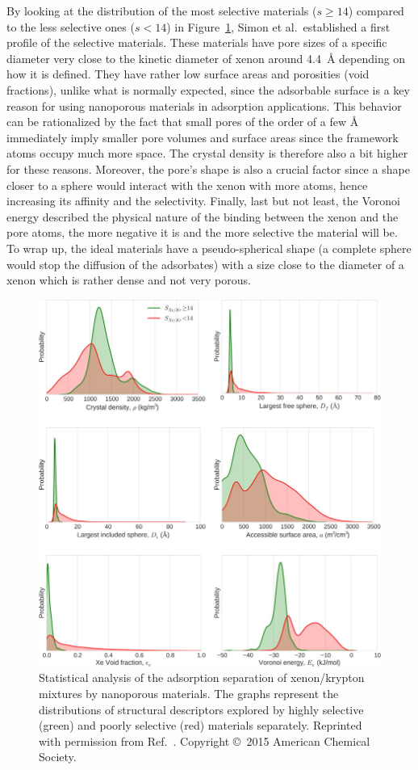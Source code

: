 \documentclass[main.tex]{subfiles}
\begin{document}
By looking at the distribution of the most selective materials ($s\geq 14$) compared to the less selective ones ($s<14$) in Figure~\ref{fgr:Simon2015}, Simon et al.\ established a first profile of the selective materials. These materials have pore sizes of a specific diameter very close to the kinetic diameter of xenon around \SI{4.4}{\angstrom} depending on how it is defined. They have rather low surface areas and porosities (void fractions), unlike what is normally expected, since the adsorbable surface is a key reason for using nanoporous materials in adsorption applications. This behavior can be rationalized by the fact that small pores of the order of a few \si{\angstrom} immediately imply smaller pore volumes and surface areas since the framework atoms occupy much more space. The crystal density is therefore also a bit higher for these reasons. Moreover, the pore's shape is also a crucial factor since a shape closer to a sphere would interact with the xenon with more atoms, hence increasing its affinity and the selectivity. Finally, last but not least, the Voronoi energy described the physical nature of the binding between the xenon and the pore atoms, the more negative it is and the more selective the material will be. To wrap up, the ideal materials have a pseudo-spherical shape (a complete sphere would stop the diffusion of the adsorbates) with a size close to the diameter of a xenon which is rather dense and not very porous.

\begin{figure}[ht]
\centering
  \includegraphics[width=0.7\linewidth]{figures/1-screening/Simon_2015_descriptors.jpeg}
  \caption{Statistical analysis of the adsorption separation of xenon/krypton mixtures by nanoporous materials. The graphs represent the distributions of structural descriptors explored by highly selective (green) and poorly selective (red) materials separately. Reprinted with permission from Ref.~\cite{Simon_2015}. Copyright \copyright\ 2015 American Chemical Society.}\label{fgr:Simon2015}
\end{figure}
\end{document}
